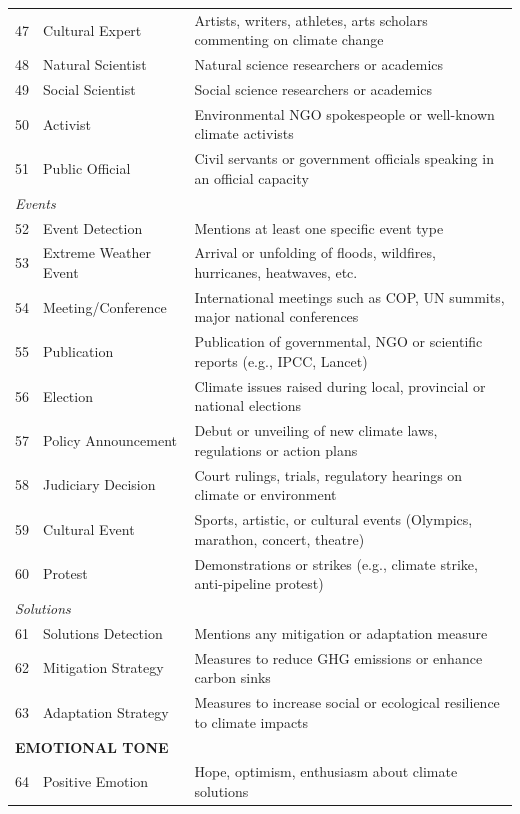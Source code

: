 {\begin{longtable}{p{0.5cm}p{5cm}p{16cm}}
47 & Cultural Expert & Artists, writers, athletes, arts scholars commenting on climate change \\
48 & Natural Scientist & Natural science researchers or academics \\
49 & Social Scientist & Social science researchers or academics \\
50 & Activist & Environmental NGO spokespeople or well-known climate activists \\
51 & Public Official & Civil servants or government officials speaking in an official capacity \\
\midrule
\multicolumn{3}{l}{\textit{Events}} \\
52 & Event Detection & Mentions at least one specific event type \\
53 & Extreme Weather Event & Arrival or unfolding of floods, wildfires, hurricanes, heatwaves, etc. \\
54 & Meeting/Conference & International meetings such as COP, UN summits, major national conferences \\
55 & Publication & Publication of governmental, NGO or scientific reports (e.g., IPCC, Lancet) \\
56 & Election & Climate issues raised during local, provincial or national elections \\
57 & Policy Announcement & Debut or unveiling of new climate laws, regulations or action plans \\
58 & Judiciary Decision & Court rulings, trials, regulatory hearings on climate or environment \\
59 & Cultural Event & Sports, artistic, or cultural events (Olympics, marathon, concert, theatre) \\
60 & Protest & Demonstrations or strikes (e.g., climate strike, anti-pipeline protest) \\
\midrule
\multicolumn{3}{l}{\textit{Solutions}} \\
61 & Solutions Detection & Mentions any mitigation or adaptation measure \\
62 & Mitigation Strategy & Measures to reduce GHG emissions or enhance carbon sinks \\
63 & Adaptation Strategy & Measures to increase social or ecological resilience to climate impacts \\
\midrule
\multicolumn{3}{l}{\cellcolor{gray!10}\textbf{EMOTIONAL TONE}} \\
64 & Positive Emotion & Hope, optimism, enthusiasm about climate solutions \\

\end{longtable}}
